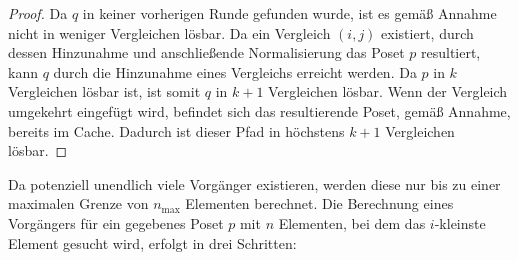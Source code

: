 \documentclass[10pt,journal,compsoc]{IEEEtran}
\begin{document}
\begin{proof} \label{proof:predecessor_calculation}
  Da $q$ in keiner vorherigen Runde gefunden wurde, ist es gemäß Annahme nicht in weniger Vergleichen lösbar.
  Da ein Vergleich $(i, j)$ existiert, durch dessen Hinzunahme und anschließende Normalisierung das Poset $p$ resultiert, kann $q$ durch die Hinzunahme eines Vergleichs erreicht werden.
  Da $p$ in $k$ Vergleichen lösbar ist, ist somit $q$ in $k + 1$ Vergleichen lösbar.
  Wenn der Vergleich umgekehrt eingefügt wird, befindet sich das resultierende Poset, gemäß Annahme, bereits im Cache.
  Dadurch ist dieser Pfad in höchstens $k + 1$ Vergleichen lösbar.
\end{proof}

Da potenziell unendlich viele Vorgänger existieren, werden diese nur bis zu einer maximalen Grenze von $n_{\text{max}}$ Elementen berechnet.
Die Berechnung eines Vorgängers für ein gegebenes Poset $p$ mit $n$ Elementen, bei dem das $i$-kleinste Element gesucht wird, erfolgt in drei Schritten:
\end{document}
